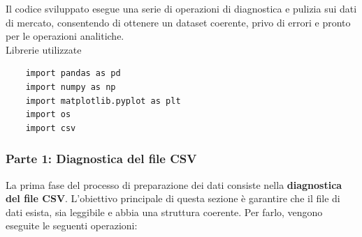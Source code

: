 \documentclass[%
	corpo=11pt,
    twoside,
    stile=classica,
    oldstyle,
    tipotesi=custom,
    greek,
    evenboxes,
]{toptesi}
\begin{document}
Il codice sviluppato esegue una serie di operazioni di diagnostica e pulizia sui dati di mercato, consentendo di ottenere un dataset coerente, privo di errori e pronto per le operazioni analitiche.\\

Librerie utilizzate
\begin{verbatim}
	import pandas as pd
	import numpy as np
	import matplotlib.pyplot as plt
	import os
	import csv
\end{verbatim}

\subsubsection{Parte 1: Diagnostica del file CSV}

La prima fase del processo di preparazione dei dati consiste nella \textbf{diagnostica del file CSV}. 
L'obiettivo principale di questa sezione è garantire che il file di dati esista, sia leggibile e abbia una struttura coerente. 
Per farlo, vengono eseguite le seguenti operazioni:
\end{document}
